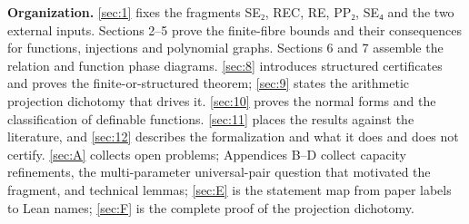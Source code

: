 \textbf{Organization.} \cref{sec:1} fixes the fragments SE₂, REC, RE, PP₂, SE₄ and the two external inputs. Sections 2–5 prove the finite-fibre bounds and their consequences for functions, injections and polynomial graphs. Sections 6 and 7 assemble the relation and function phase diagrams. \cref{sec:8} introduces structured certificates and proves the finite-or-structured theorem; \cref{sec:9} states the arithmetic projection dichotomy that drives it. \cref{sec:10} proves the normal forms and the classification of definable functions. \cref{sec:11} places the results against the literature, and \cref{sec:12} describes the formalization and what it does and does not certify. \cref{sec:A} collects open problems; Appendices B–D collect capacity refinements, the multi-parameter universal-pair question that motivated the fragment, and technical lemmas; \cref{sec:E} is the statement map from paper labels to Lean names; \cref{sec:F} is the complete proof of the projection dichotomy.

